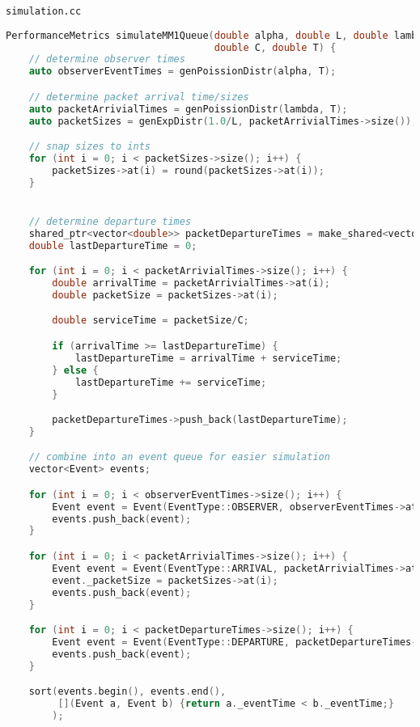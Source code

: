 \documentclass{article}
\begin{document}
\texttt{simulation.cc}
\begin{lstlisting}[language=C++,
                   directivestyle={\color{black}}
                   emph={int,char,double,float,unsigned},
                   emphstyle={\color{blue}}
                  ]
PerformanceMetrics simulateMM1Queue(double alpha, double L, double lambda,
                                    double C, double T) {
    // determine observer times
    auto observerEventTimes = genPoissionDistr(alpha, T);

    // determine packet arrival time/sizes
    auto packetArrivialTimes = genPoissionDistr(lambda, T);
    auto packetSizes = genExpDistr(1.0/L, packetArrivialTimes->size());

    // snap sizes to ints
    for (int i = 0; i < packetSizes->size(); i++) {
        packetSizes->at(i) = round(packetSizes->at(i));
    }


    // determine departure times
    shared_ptr<vector<double>> packetDepartureTimes = make_shared<vector<double>>();
    double lastDepartureTime = 0;

    for (int i = 0; i < packetArrivialTimes->size(); i++) {
        double arrivalTime = packetArrivialTimes->at(i);
        double packetSize = packetSizes->at(i);

        double serviceTime = packetSize/C;

        if (arrivalTime >= lastDepartureTime) {
            lastDepartureTime = arrivalTime + serviceTime;
        } else {
            lastDepartureTime += serviceTime;
        }

        packetDepartureTimes->push_back(lastDepartureTime);
    }

    // combine into an event queue for easier simulation
    vector<Event> events;

    for (int i = 0; i < observerEventTimes->size(); i++) {
        Event event = Event(EventType::OBSERVER, observerEventTimes->at(i));
        events.push_back(event);
    }

    for (int i = 0; i < packetArrivialTimes->size(); i++) {
        Event event = Event(EventType::ARRIVAL, packetArrivialTimes->at(i));
        event._packetSize = packetSizes->at(i);
        events.push_back(event);
    }

    for (int i = 0; i < packetDepartureTimes->size(); i++) {
        Event event = Event(EventType::DEPARTURE, packetDepartureTimes->at(i));
        events.push_back(event);
    }

    sort(events.begin(), events.end(),
         [](Event a, Event b) {return a._eventTime < b._eventTime;}
        );


\end{lstlisting}
\end{document}

